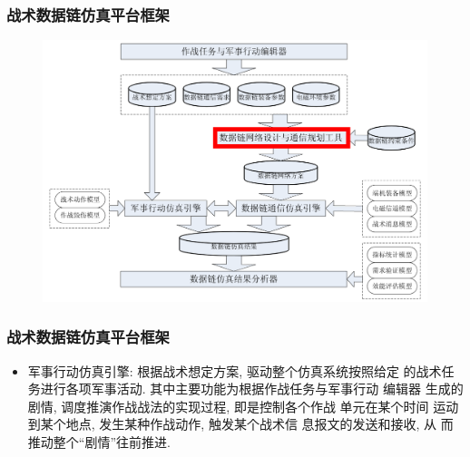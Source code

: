 \documentclass[10pt,mathserif]{beamer}%
\begin{document}
\begin{frame}[fragile]
	\frametitle{战术数据链仿真平台框架}
	\setlength{\parindent}{2em}
	\begin{spacing}{1.5}
		\begin{figure}[htb]
			\centering
			\includegraphics[width=1\linewidth]{./images/arch2.png}
		\end{figure}
	\end{spacing}
\end{frame}

\begin{frame}[fragile]
	\frametitle{战术数据链仿真平台框架}
	\begin{spacing}{1.5}
		\begin{itemize}
			\item 军事行动仿真引擎: 根据战术想定方案, 驱动整个仿真系统按照给定
				的战术任务进行各项军事活动. 其中主要功能为根据作战任务与军事行动
				编辑器 生成的剧情, 调度推演作战战法的实现过程, 即是控制各个作战
				单元在某个时间 运动到某个地点, 发生某种作战动作, 触发某个战术信
				息报文的发送和接收, 从 而推动整个``剧情''往前推进. 
		\end{itemize}
	\end{spacing}
\end{frame}
\end{document}
